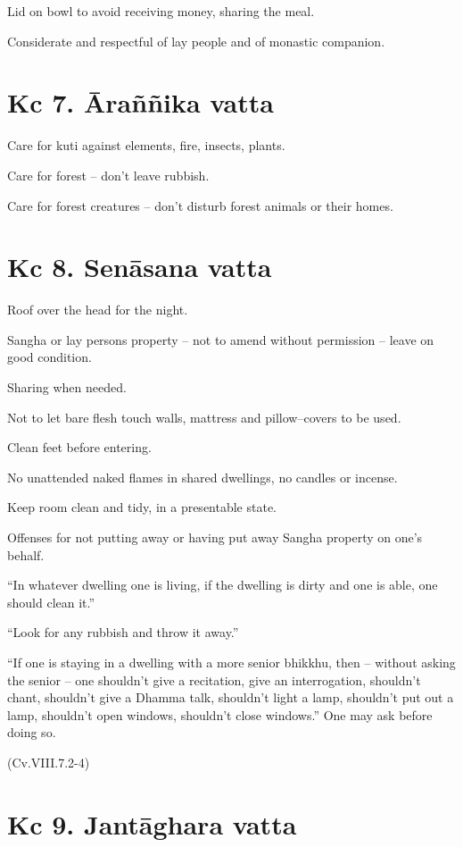 Lid on bowl to avoid receiving money, sharing the meal.

Considerate and respectful of lay people and of monastic companion.

\section{Kc 7. Āraññika vatta}

Care for kuti against elements, fire, insects, plants.

Care for forest -- don't leave rubbish.

Care for forest creatures -- don't disturb forest animals or their
homes.

\section{Kc 8. Senāsana vatta}

Roof over the head for the night.

Sangha or lay persons property -- not to amend without permission --
leave on good condition.

Sharing when needed.

Not to let bare flesh touch walls, mattress and pillow--covers to be
used.

Clean feet before entering.

No unattended naked flames in shared dwellings, no candles or incense.

Keep room clean and tidy, in a presentable state.

Offenses for not putting away or having put away Sangha property on
one's behalf.

``In whatever dwelling one is living, if the dwelling is dirty and one
is able, one should clean it.''

``Look for any rubbish and throw it away.''

``If one is staying in a dwelling with a more senior bhikkhu, then --
without asking the senior -- one shouldn't give a recitation, give an
interrogation, shouldn't chant, shouldn't give a Dhamma talk, shouldn't
light a lamp, shouldn't put out a lamp, shouldn't open windows,
shouldn't close windows.'' One may ask before doing so.

(Cv.VIII.7.2-4)

\section{Kc 9. Jantāghara vatta}

